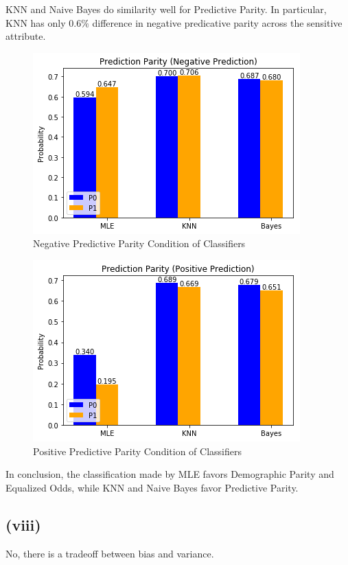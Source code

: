 \documentclass[twoside,11pt]{homework}
\begin{document}
	KNN and Naive Bayes do similarity well for Predictive Parity. In particular, KNN has only $0.6\%$ difference in 
	negative predicative parity across the sensitive attribute.
	\begin{figure}[H]
		\centering
		\includegraphics[scale=.5]{q5_fig/pp_neg.png}	
		\caption{Negative Predictive Parity Condition of Classifiers}
	\end{figure}
	\begin{figure}[H]
		\centering
		\includegraphics[scale=.5]{q5_fig/pp_pos.png}	
		\caption{Positive Predictive Parity Condition of Classifiers}
	\end{figure}
	In conclusion, the classification made by MLE favors Demographic Parity and Equalized Odds, while 
	KNN and Naive Bayes favor Predictive Parity.

\subsection*{(viii)}  
	No, there is a tradeoff between bias and variance.
\end{document}
